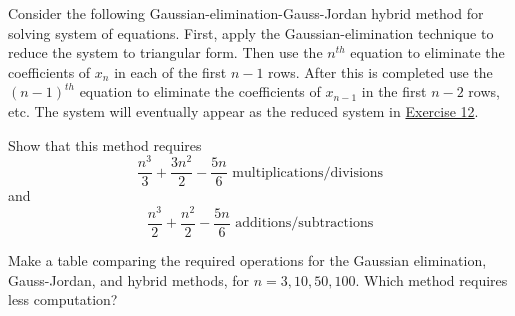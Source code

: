 \documentclass[../../../../Assignments]{subfiles}
\begin{document}
\begin{exercise}
    Consider the following Gaussian-elimination-Gauss-Jordan hybrid method for
    solving system of equations. First, apply the Gaussian-elimination technique
    to reduce the system to triangular form. Then use the \(n^{th}\) equation to
    eliminate the coefficients of \(x_n\) in each of the first \(n - 1\) rows.
    After this is completed use the \((n - 1)^{th}\) equation to eliminate the
    coefficients of \(x_{n - 1}\) in the first \(n - 2\) rows, etc. The system
    will eventually appear as the reduced system in
    \hyperref[exer:3.1.12]{Exercise 12}.

    \begin{tasks}
        \task Show that this method requires
            \[\frac{n^3}{3} + \frac{3n^2}{2} - \frac{5n}{6} \text{ multiplications/divisions}\]
            and
            \[\frac{n^3}{2} + \frac{n^2}{2} - \frac{5n}{6} \text{ additions/subtractions}\]

        \task Make a table comparing the required operations for the Gaussian
            elimination, Gauss-Jordan, and hybrid methods, for \(n = 3, 10, 50,
            100\). Which method requires less computation?
    \end{tasks}
\end{exercise}
\end{document}
